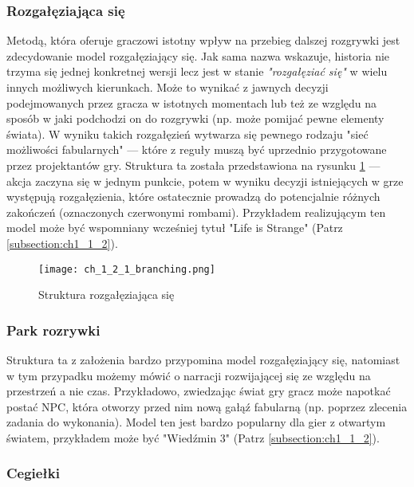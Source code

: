 \subsubsection*{Rozgałęziająca się}

Metodą, która oferuje graczowi istotny wpływ na przebieg dalszej rozgrywki jest zdecydowanie
model rozgałęziający się. Jak sama nazwa wskazuje, historia nie trzyma się jednej konkretnej wersji
lecz jest w stanie \textit{"rozgałęziać się"} w wielu innych możliwych kierunkach. Może to wynikać
z jawnych decyzji podejmowanych przez gracza w istotnych momentach lub też ze względu na sposób
w jaki podchodzi on do rozgrywki (np. może pomijać pewne elementy świata)\cite{theorising_narrative}.
W wyniku takich rozgałęzień wytwarza się pewnego rodzaju "sieć możliwości fabularnych"\cite{theorising_narrative}
--- które z reguły muszą być uprzednio przygotowane przez projektantów gry. Struktura ta została
przedstawiona na rysunku \ref{fig:ch1_2_1_branching} --- akcja zaczyna się w jednym punkcie, potem
w wyniku decyzji istniejących w grze występują rozgałęzienia, które ostatecznie prowadzą do potencjalnie
różnych zakończeń (oznaczonych czerwonymi rombami). Przykładem realizującym ten model może być
wspomniany wcześniej tytuł "Life is Strange" (Patrz \ref{subsection:ch1_1_2}).

\begin{figure}[h]
	\caption{Struktura rozgałęziająca się}
	\texttt{[image: ch\_1\_2\_1\_branching.png]}
	\centering
	\label{fig:ch1_2_1_branching}
\end{figure}

\newpage

\subsubsection*{Park rozrywki}

Struktura ta z założenia bardzo przypomina model rozgałęziający się, natomiast w tym przypadku
możemy mówić o narracji rozwijającej się ze względu na przestrzeń a nie czas\cite{theorising_narrative}.
Przykładowo, zwiedzając świat gry gracz może napotkać postać NPC, która otworzy przed nim nową
gałąź fabularną (np. poprzez zlecenia zadania do wykonania)\cite{the_evolution_of_video_games}.
Model ten jest bardzo popularny dla gier z otwartym światem, przykładem może być "Wiedźmin 3"
(Patrz \ref{subsection:ch1_1_2}).

\subsubsection*{Cegiełki}

